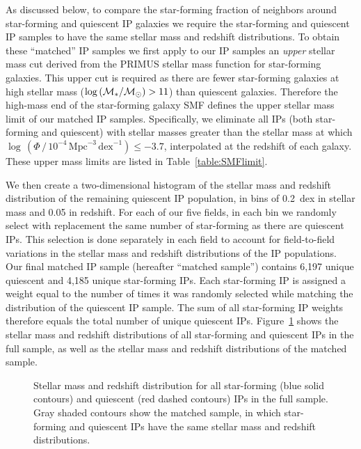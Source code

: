As discussed below, to compare the star-forming fraction of neighbors around star-forming and quiescent IP galaxies we require the star-forming and quiescent IP samples to have the same stellar mass and redshift distributions.
To obtain these ``matched'' IP samples we first apply to our IP samples an {\it upper} stellar mass cut derived from the PRIMUS stellar mass function \citep[SMF, denoted $\Phi$; see][]{Moustakas13} for star-forming galaxies.
This upper cut is required as there are fewer star-forming galaxies at high stellar mass ($\logM>11$) than quiescent galaxies.
Therefore the high-mass end of the star-forming galaxy SMF defines the upper stellar mass limit of our matched IP samples.  
Specifically, we eliminate all IPs (both star-forming and quiescent) with stellar masses greater than the stellar mass at which 
${\log\,(\Phi \,/\, 10^{-4}\,\text{Mpc}^{-3}\,\text{dex}^{-1}) \le -3.7}$, interpolated at the redshift of each galaxy.
These upper mass limits are listed in Table~\ref{table:SMFlimit}.



We then create a two-dimensional histogram of the stellar mass and redshift distribution of the remaining quiescent IP population, in bins of 0.2~dex in stellar mass and 0.05 in redshift.
For each of our five fields, in each bin we randomly select with replacement the same number of star-forming as there are quiescent IPs.
This selection is done separately in each field to account for field-to-field variations in the stellar mass and redshift distributions of the IP populations.
Our final matched IP sample (hereafter ``matched sample'') contains 6,197 unique quiescent and 4,185 unique star-forming IPs.
Each star-forming IP is assigned a weight equal to the number of times it was randomly selected while matching the distribution of the quiescent IP sample.
The sum of all star-forming IP weights therefore equals the total number of unique quiescent IPs.
Figure~\ref{fig:IPsample_matched} shows the stellar mass and redshift distributions of all star-forming and quiescent IPs in the full sample, as well as the stellar mass and redshift distributions of the matched sample.

\begin{figure}
  \epstrim{0.4in 0.2in 0.2in 0.4in}
  \caption{Stellar mass and redshift distribution for all star-forming (blue solid contours) and quiescent (red dashed contours) IPs in the full sample. 
Gray shaded contours show the matched sample, in which star-forming and quiescent IPs have the same stellar mass and redshift distributions.
} 
  \label{fig:IPsample_matched}
\end{figure}

